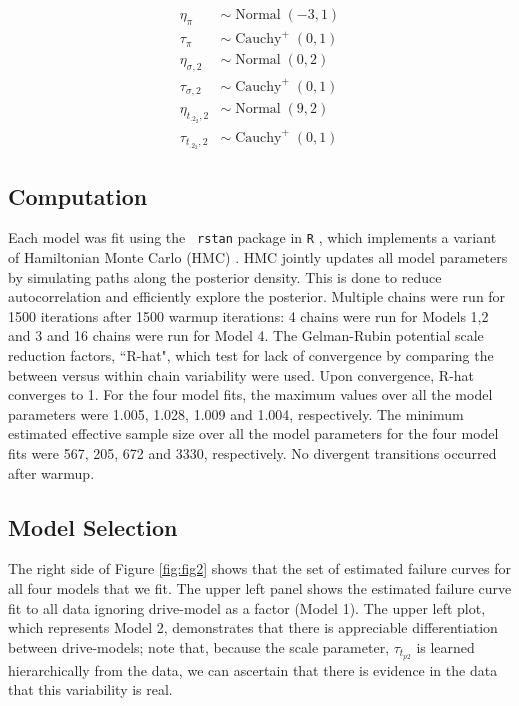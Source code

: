 \documentclass[12pt]{article}
\newcommand{\op}{\operatorname}
\begin{document}
\begin{align*}
  \eta_{\pi} & \sim \op{Normal}(-3, 1)\\
  \tau_{\pi} & \sim \op{Cauchy}^+(0, 1)\\
  \eta_{\sigma ,2} & \sim \op{Normal}(0, 2)\\
  \tau_{\sigma ,2} & \sim \op{Cauchy}^+(0, 1)\\
  \eta_{t_{.2_2},2} & \sim \op{Normal}(9, 2)\\
  \tau_{t_{.2_2},2} & \sim \op{Cauchy}^+(0, 1)
 \end{align*} 

\subsection{Computation}
\label{sec:Computation}
Each model was fit using the {\tt
  rstan}\cite{rstan} package in {\tt R} \cite{r}, which implements a variant of Hamiltonian Monte Carlo (HMC)
\cite{betancourt}. HMC jointly updates all model parameters by simulating paths along the posterior density. This is done to reduce autocorrelation and efficiently explore the posterior. Multiple chains were run for 1500 iterations after 1500 warmup iterations: 4 chains were run for Models 1,2 and 3 and 16 chains were run for Model 4. The Gelman-Rubin potential scale reduction factors, ``R-hat", which test for lack of convergence by comparing the between versus within chain variability were used. Upon convergence, R-hat converges to 1. For the four model fits, the  maximum values over all the model parameters were 1.005, 1.028, 1.009 and 1.004, respectively. The minimum estimated effective sample size over all the model parameters for the four model fits were 567, 205, 672 and 3330, respectively. No divergent transitions occurred after warmup.




\subsection{Model Selection}
\label{sec:Model Comparisons}
The right side of Figure \ref{fig:fig2} shows that the set of estimated failure curves for all four models that we fit. The upper left panel shows the estimated failure curve fit to all data ignoring drive-model as a factor (Model 1). The upper left plot, which represents Model 2, demonstrates that there is appreciable differentiation between drive-models; note that, because the scale parameter, $\tau_{t_{p2}}$ is learned hierarchically from the data, we can ascertain that there is evidence in the data that this variability is real.
\end{document}
